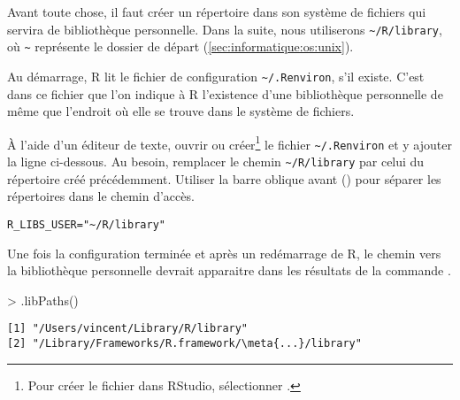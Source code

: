 Avant toute chose, il faut créer un répertoire dans son système de
fichiers qui servira de bibliothèque personnelle. Dans la suite, nous
utiliserons \verb=~/R/library=, où \verb=~= représente le dossier de
départ (\autoref{sec:informatique:os:unix}).


Au démarrage, R lit le fichier de configuration \verb=~/.Renviron=,
s'il existe. C'est dans ce fichier que l'on indique à R l'existence
d'une bibliothèque personnelle de même que l'endroit où elle se trouve
dans le système de fichiers.

À l'aide d'un éditeur de texte, ouvrir ou créer\footnote{Pour créer le
  fichier dans RStudio, sélectionner .} %
le fichier \verb=~/.Renviron= et y ajouter la ligne ci-dessous. Au
besoin, remplacer le chemin \verb=~/R/library= par celui du répertoire
créé précédemment. Utiliser la barre oblique avant (\code{/}) pour
séparer les répertoires dans le chemin d'accès.
\begin{Schunk}
\begin{verbatim}
R_LIBS_USER="~/R/library"
\end{verbatim}
\end{Schunk}


Une fois la configuration terminée et après un redémarrage de R, le
chemin vers la bibliothèque personnelle devrait apparaitre dans les
résultats de la commande
.
\begin{Schunk}
\begin{Sinput}
> .libPaths()
\end{Sinput}
\begin{Verbatim}[commandchars=\\\{\}]
[1] "/Users/vincent/Library/R/library"
[2] "/Library/Frameworks/R.framework/\meta{...}/library"
\end{Verbatim}
\end{Schunk}

